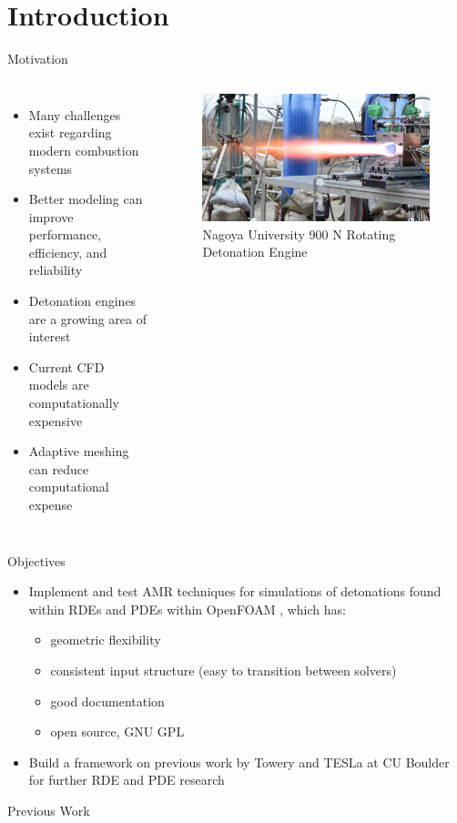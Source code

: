 \section{Introduction}
\begin{frame}{Motivation}
\begin{columns}
\begin{itemize}
\item Many challenges exist regarding modern combustion systems 
\item Better modeling can improve performance, efficiency, and reliability 
\item Detonation engines are a growing area of interest 
\item Current CFD models are computationally expensive
\item Adaptive meshing can reduce computational expense
\end{itemize}	

\begin{figure}
\centering
\includegraphics[width=\textwidth]{../figs/rde.jpg}
\caption{Nagoya University 900 N Rotating Detonation Engine \cite{nagoya}}
\end{figure}
\end{columns}
\end{frame}

\begin{frame}{Objectives}
\begin{itemize}
\item Implement and test AMR techniques for simulations of detonations found within RDEs and PDEs within OpenFOAM \cite{weller}, which has:
\begin{itemize}
\item geometric flexibility 
\item consistent input structure (easy to transition between solvers)
\item good documentation
\item open source, GNU GPL
\end{itemize}
\item Build a framework on previous work by Towery \cite{towery1} and TESLa at CU Boulder for further RDE and PDE research 
\end{itemize}
\end{frame}

\begin{frame}{Previous Work}
    
\end{frame}
